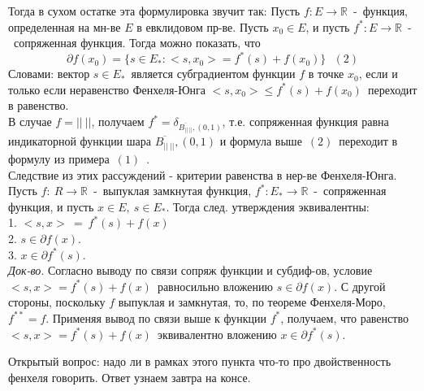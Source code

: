 Тогда в сухом остатке эта формулировка звучит так: Пусть $f: E \to \mathbb{R}$~-~функция, определенная на мн-ве $E$ в евклидовом пр-ве. Пусть $x_0 \in E$, и пусть $f^*:E \to \mathbb{R}$~-~сопряженная функция. Тогда можно показать, что
$$
\partial f(x_0)=\{s \in E_{*}:<s,x_0>=f^{*}(s)+f(x_0)\}~~~(2)
$$
Словами: вектор $s \in E_{*}$~является субградиентом функции $f$ в точке $x_0$, если и только если неравенство Фенхеля-Юнга $<s,x_0> \leq f^{*}(s)+f(x_0)$~переходит в равенство.\\
В случае $f=||~||$, получаем $f^{*}=\delta_{\overline{B_{||~||}},(0,1)}$, т.е. сопряженная функция равна индикаторной функции шара $\overline{B_{||~||}},(0,1)$ и формула выше~$(2)$~переходит в формулу из примера~$(1)$~.\\

Следствие из этих рассуждений - критерии равенства в нер-ве Фенхеля-Юнга. Пусть $f:~R \to \mathbb{R}$~-~выпуклая замкнутая функция, $f^{*}:E_{*} \to \mathbb{R}$~-~сопряженная функция, и пусть $x \in E,~s \in E_{*}$. Тогда след. утверждения эквивалентны:\\
1. $<s,x>~=~f^{*}(s)+f(x)$\\
2. $s \in \partial f(x)$.\\
3. $x \in \partial f^{*}(s)$.\\
\textit{Док-во}. Согласно выводу по связи сопряж функции и субдиф-ов, условие $<s,x>=f^{*}(s)+f(x)$~равносильно вложению $s \in \partial f(x)$. С другой стороны, поскольку $f$ выпуклая и замкнутая, то, по теореме Фенхеля-Моро, $f^{**}=f$. Применяя вывод по связи выше к функции $f^{*}$, получаем, что равенство $<s,x>=f^{*}(s)+f(x)$~эквивалентно вложению $x \in \partial f^{*}(s)$.

Открытый вопрос: надо ли в рамках этого пункта что-то про двойственность фенхеля говорить. Ответ узнаем завтра на консе.